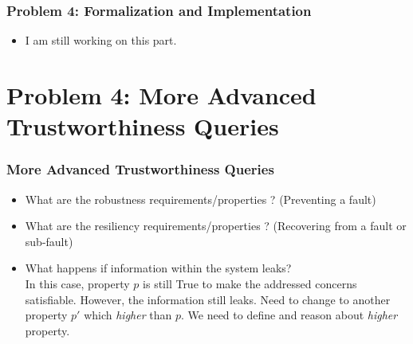 \documentclass{beamer}
\begin{document}
\begin{frame}[fragile]
	\frametitle{Problem 4: Formalization and Implementation}
	\begin{itemize}
		\item I am still working on this part. 	   
	\end{itemize}
\end{frame}

\section{Problem 4: More Advanced Trustworthiness Queries} 
\begin{frame}
	\frametitle{More Advanced Trustworthiness Queries}
	\begin{itemize}
		\item What are the robustness requirements/properties ? (Preventing a fault)
		\item What are the resiliency requirements/properties ? (Recovering from a fault or sub-fault) 
		\item  What happens if information within the system leaks? \\
		 In this case, property $p$ is still True to make the addressed concerns satisfiable. However, the information still leaks. Need to change to another property $p'$ which \emph{higher} than $p$. We need to define and reason about \emph{higher} property.
 	\end{itemize}
\end{frame}


%


        
\end{document}
